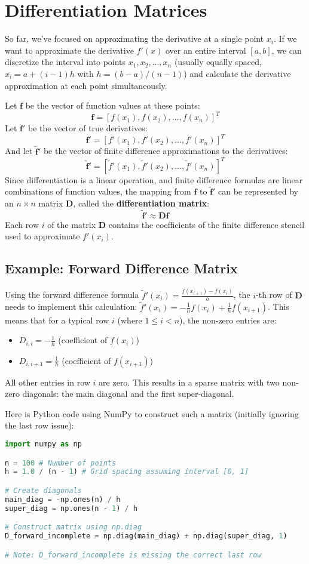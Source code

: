 \documentclass{article}
\begin{document}
\section{Differentiation Matrices}

So far, we've focused on approximating the derivative at a single point $x_i$. If we want to approximate the derivative $f'(x)$ over an entire interval $[a, b]$, we can discretize the interval into points $x_1, x_2, \dots, x_n$ (usually equally spaced, $x_i = a + (i-1)h$ with $h = (b-a)/(n-1)$) and calculate the derivative approximation at each point simultaneously.

Let $\mathbf{f}$ be the vector of function values at these points:
\[
\mathbf{f} = [f(x_1), f(x_2), \dots, f(x_n)]^T
\]
Let $\mathbf{f}'$ be the vector of true derivatives:
\[
\mathbf{f}' = [f'(x_1), f'(x_2), \dots, f'(x_n)]^T
\]
And let $\tilde{\mathbf{f}}'$ be the vector of finite difference approximations to the derivatives:
\[
\tilde{\mathbf{f}}' = [\tilde{f}'(x_1), \tilde{f}'(x_2), \dots, \tilde{f}'(x_n)]^T
\]
Since differentiation is a linear operation, and finite difference formulas are linear combinations of function values, the mapping from $\mathbf{f}$ to $\tilde{\mathbf{f}}'$ can be represented by an $n \times n$ matrix $\mathbf{D}$, called the \textbf{differentiation matrix}:
\[
\tilde{\mathbf{f}}' \approx \mathbf{D} \mathbf{f}
\]
Each row $i$ of the matrix $\mathbf{D}$ contains the coefficients of the finite difference stencil used to approximate $f'(x_i)$.

\subsection{Example: Forward Difference Matrix}
Using the forward difference formula $\tilde{f}'(x_i) = \frac{f(x_{i+1}) - f(x_i)}{h}$, the $i$-th row of $\mathbf{D}$ needs to implement this calculation: $\tilde{f}'(x_i) = -\frac{1}{h} f(x_i) + \frac{1}{h} f(x_{i+1})$.
This means that for a typical row $i$ (where $1 \le i < n$), the non-zero entries are:
\begin{itemize}
    \item $D_{i,i} = -\frac{1}{h}$ (coefficient of $f(x_i)$)
    \item $D_{i, i+1} = \frac{1}{h}$ (coefficient of $f(x_{i+1})$)
\end{itemize}
All other entries in row $i$ are zero. This results in a sparse matrix with two non-zero diagonals: the main diagonal and the first super-diagonal.

Here is Python code using NumPy to construct such a matrix (initially ignoring the last row issue):
\begin{lstlisting}[language=Python, breaklines=true]
import numpy as np

n = 100 # Number of points
h = 1.0 / (n - 1) # Grid spacing assuming interval [0, 1]

# Create diagonals
main_diag = -np.ones(n) / h
super_diag = np.ones(n - 1) / h

# Construct matrix using np.diag
D_forward_incomplete = np.diag(main_diag) + np.diag(super_diag, 1)

# Note: D_forward_incomplete is missing the correct last row
\end{lstlisting}
\end{document}
